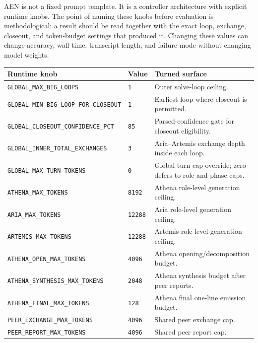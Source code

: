 \documentclass[11pt]{article}
\begin{document}
AEN is not a fixed prompt template. It is a controller architecture with explicit runtime knobs. The point of naming these knobs before evaluation is methodological: a result should be read together with the exact loop, exchange, closeout, and token-budget settings that produced it. Changing these values can change accuracy, wall time, transcript length, and failure mode without changing model weights.

\begin{table}[H]
\centering
\footnotesize
\setlength{\tabcolsep}{4pt}
\renewcommand{\arraystretch}{1.08}
\begin{tabularx}{\textwidth}{>{\raggedright\arraybackslash}p{}>{\raggedright\arraybackslash}p{}X}
\toprule
Runtime knob & Value & Turned surface \\
\midrule
\texttt{GLOBAL\_MAX\_BIG\_LOOPS} & \texttt{1} & Outer solve-loop ceiling. \\
\texttt{GLOBAL\_MIN\_BIG\_LOOP\_FOR\_CLOSEOUT} & \texttt{1} & Earliest loop where closeout is permitted. \\
\texttt{GLOBAL\_CLOSEOUT\_CONFIDENCE\_PCT} & \texttt{85} & Parsed-confidence gate for closeout eligibility. \\
\texttt{GLOBAL\_INNER\_TOTAL\_EXCHANGES} & \texttt{3} & Aria--Artemis exchange depth inside each loop. \\
\texttt{GLOBAL\_MAX\_TURN\_TOKENS} & \texttt{0} & Global turn cap override; zero defers to role and phase caps. \\
\texttt{ATHENA\_MAX\_TOKENS} & \texttt{8192} & Athena role-level generation ceiling. \\
\texttt{ARIA\_MAX\_TOKENS} & \texttt{12288} & Aria role-level generation ceiling. \\
\texttt{ARTEMIS\_MAX\_TOKENS} & \texttt{12288} & Artemis role-level generation ceiling. \\
\texttt{ATHENA\_OPEN\_MAX\_TOKENS} & \texttt{4096} & Athena opening/decomposition budget. \\
\texttt{ATHENA\_SYNTHESIS\_MAX\_TOKENS} & \texttt{2048} & Athena synthesis budget after peer reports. \\
\texttt{ATHENA\_FINAL\_MAX\_TOKENS} & \texttt{128} & Athena final one-line emission budget. \\
\texttt{PEER\_EXCHANGE\_MAX\_TOKENS} & \texttt{4096} & Shared peer exchange cap. \\
\texttt{PEER\_REPORT\_MAX\_TOKENS} & \texttt{4096} & Shared peer report cap. \\

\end{tabularx}
\end{table}
\end{document}
